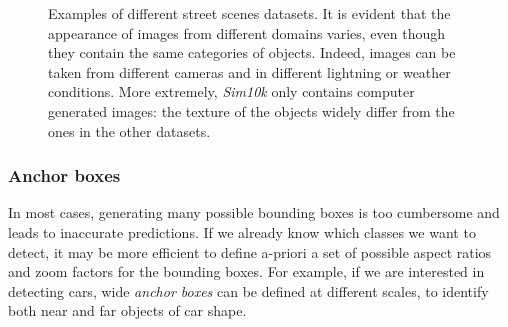 \documentclass[%
    corpo=12pt,
    twoside,
    stile=classica,   
    tipotesi=magistrale,
    evenboxes,
    english,
	numerazioneromana,
]{toptesi}
\begin{document}
\begin{figure}[p]
	\centering
	\caption{Examples of different street scenes datasets. It is evident that the appearance of images from different domains varies, even though they contain the same categories of objects. Indeed, images can be taken from different cameras and in different lightning or weather conditions. More extremely, \textit{Sim10k} only contains computer generated images: the texture of the objects widely differ from the ones in the other datasets.}
	\label{fig:datasets}
\end{figure}

\subsubsection{Anchor boxes}\label{sec:anchor}
In most cases, generating many possible bounding boxes is too cumbersome and leads to inaccurate predictions. If we already know which classes we want to detect, it may be more efficient to define a-priori a set of possible aspect ratios and zoom factors for the bounding boxes. For example, if we are interested in detecting cars, wide \textit{anchor boxes} can be defined at different scales, to identify both near and far objects of car shape.
\end{document}
